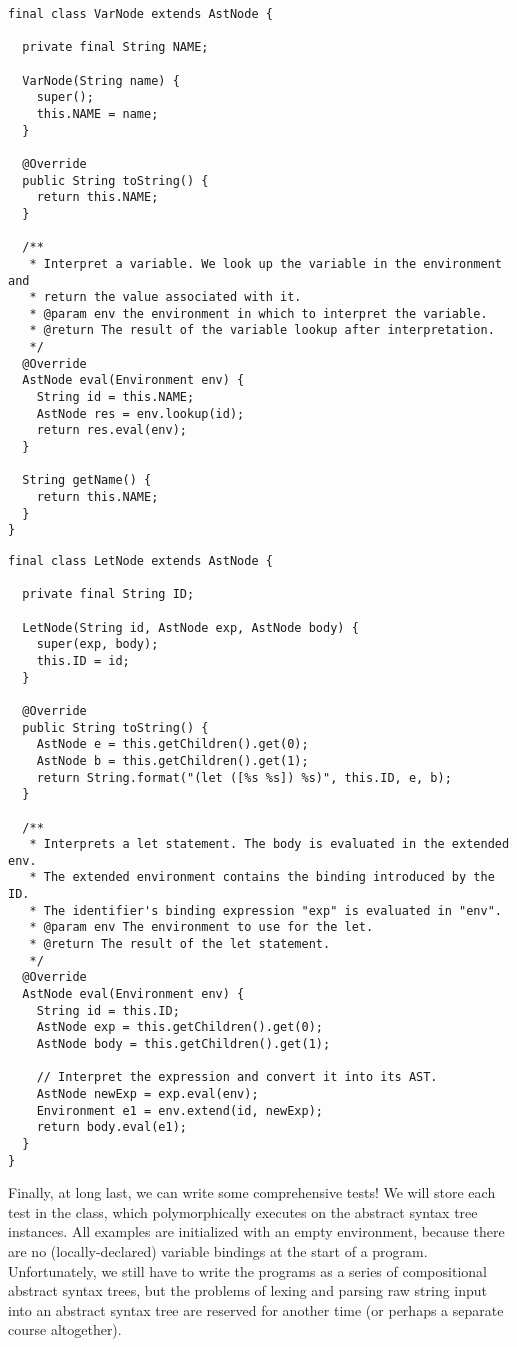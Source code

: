 \enlargethispage{-6\baselineskip}
\begin{lstlisting}[language=MyJava]
final class VarNode extends AstNode {

  private final String NAME;

  VarNode(String name) {
    super();
    this.NAME = name;
  }

  @Override
  public String toString() { 
    return this.NAME; 
  }

  /**
   * Interpret a variable. We look up the variable in the environment and
   * return the value associated with it.
   * @param env the environment in which to interpret the variable.
   * @return The result of the variable lookup after interpretation.
   */
  @Override
  AstNode eval(Environment env) {
    String id = this.NAME;
    AstNode res = env.lookup(id);
    return res.eval(env);
  }

  String getName() {
    return this.NAME;
  }
}
\end{lstlisting}
  
\begin{lstlisting}[language=MyJava]
final class LetNode extends AstNode {

  private final String ID;

  LetNode(String id, AstNode exp, AstNode body) {
    super(exp, body);
    this.ID = id;
  }
  
  @Override
  public String toString() {
    AstNode e = this.getChildren().get(0);
    AstNode b = this.getChildren().get(1);
    return String.format("(let ([%s %s]) %s)", this.ID, e, b);
  }

  /**
   * Interprets a let statement. The body is evaluated in the extended env.
   * The extended environment contains the binding introduced by the ID.
   * The identifier's binding expression "exp" is evaluated in "env".
   * @param env The environment to use for the let.
   * @return The result of the let statement.
   */
  @Override
  AstNode eval(Environment env) {
    String id = this.ID;
    AstNode exp = this.getChildren().get(0);
    AstNode body = this.getChildren().get(1);

    // Interpret the expression and convert it into its AST.
    AstNode newExp = exp.eval(env);
    Environment e1 = env.extend(id, newExp);
    return body.eval(e1);
  }
}
\end{lstlisting}

Finally, at long last, we can write some comprehensive tests! 
We will store each test in the  class, which polymorphically executes  on the abstract syntax tree instances. 
All examples are initialized with an empty environment, because there are no (locally-declared) variable bindings at the start of a program. 
Unfortunately, we still have to write the programs as a series of compositional abstract syntax trees, but the problems of lexing and parsing raw string input into an abstract syntax tree are reserved for another time (or perhaps a separate course altogether). 

